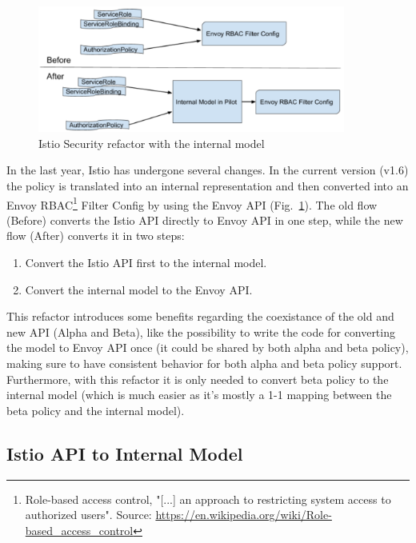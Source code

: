 \begin{figure}
    \centering
    \includegraphics[width=0.9\textwidth]{chapters/images/chp3/before-after.png}
    \caption{Istio Security refactor with the internal model}
    \label{fig:int-rep}
\end{figure}


In the last year, Istio has undergone several changes. In the current version (v1.6) the policy is translated into an internal representation and then converted into an Envoy RBAC\footnote{Role-based access control, "[...] an approach to restricting system access to authorized users". Source: \url{https://en.wikipedia.org/wiki/Role-based_access_control}} Filter Config by using the Envoy API (Fig.~\ref{fig:int-rep}).
The old flow (Before) converts the Istio API directly to Envoy API in one step, while the new flow (After) converts it in two steps: 
\begin{enumerate}
    \item Convert the Istio API first to the internal model.
    \item Convert the internal model to the Envoy API.
\end{enumerate}

This refactor introduces some benefits regarding the coexistance of the old and new API (Alpha and Beta), like the possibility to write the code for converting the model to Envoy API once (it could be shared by both alpha and beta policy), making sure to have consistent behavior for both alpha and beta policy support. Furthermore, with this refactor it is only needed to convert beta policy to the internal model (which is much easier as it’s mostly a 1-1 mapping between the beta policy and the internal model).

\subsection{Istio API to Internal Model}

